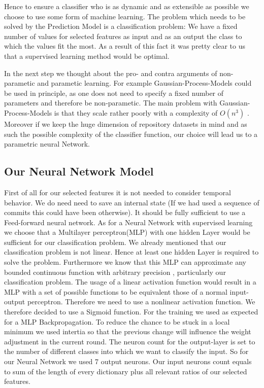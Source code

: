 \documentclass[paper=A4,pagesize=auto,13pt,headinclude=true,footinclude=true,BCOR=0mm,DIV=calc]{scrartcl}
\begin{document}
	Hence to ensure a classifier who is as dynamic and as extensible as possible we choose to use some form of machine learning.
	The problem which needs to be solved by the Prediction Model is a classification problem: We have a fixed number of values for selected features as input and as an output the class to which the values fit the most. As a result of this fact it was pretty clear to us that a supervised learning method would be optimal.
	
	In the next step we thought about the pro- and contra arguments of non-parametic and parametic learning.
	For example Gaussian-Process-Models could be used in principle, as one does not need to specify a fixed number of parameters and therefore be non-parametic. 
	The main problem with Gaussian-Process-Models is that they scale rather poorly with a complexity of $O(n^{3})$ \cite{DukeUniversity}. Moreover if we keep the huge dimension of repository datasets in mind and as such the possible complexity of the classifier function, our choice will lead us to a parametric neural Network.
	
	\subsection{Our Neural Network Model}
First of all for our selected features it is not needed to consider temporal behavior. We do need need to save an internal state (If we had used a sequence of commits this could have been otherwise). It should be fully sufficient to use a Feed-forward neural network.
As for a Neural Network with supervised learning we choose that a Multilayer perceptron(MLP) with one hidden Layer would be sufficient for our classification problem. We already mentioned that our classification problem is not linear. Hence at least one hidden Layer is required to solve the problem. Furthermore we know that this MLP can approximate any bounded continuous function with arbitrary precision \cite{ApproximateAnyFunction}, particularly our classification problem.
The usage of a linear activation function would result in a MLP with a set of possible functions to be equivalent those of a normal input-output perceptron. Therefore we need to use a nonlinear activation function. We therefore decided to use a Sigmoid function. 
For the training we used as expected for a MLP Backpropagation. To reduce the chance to be stuck in a local minimum we used intertia so that the previous change will influence the weight adjustment in the current round.
The neuron count for the output-layer is set to the number of different classes into which we want to classify the input. So for our Neural Network we used 7 output neurons.
Our input neurons count equals to sum of the length of every dictionary plus all relevant ratios of our selected features.
\end{document}
